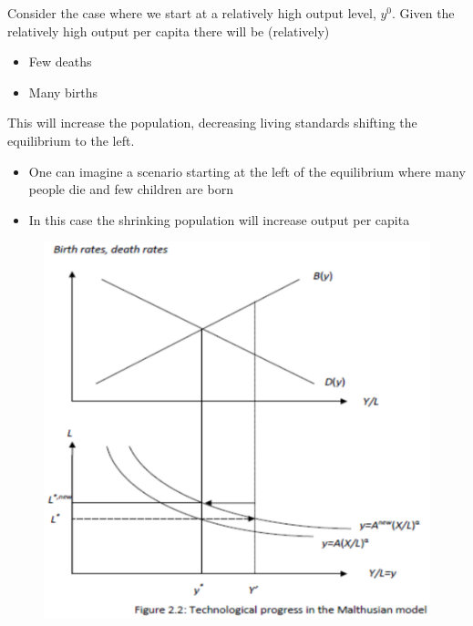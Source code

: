 \documentclass{beamer}
\begin{document}
\begin{frame}
  Consider the case where we start at a relatively high output level, $y^0$.
  Given the relatively high output per capita there will be (relatively)
  \begin{itemize}
    \item Few deaths
    \item Many births
  \end{itemize}
  \medskip
  This will increase the population, decreasing living standards shifting the equilibrium to the left. 
  \begin{itemize}
    \item One can imagine a scenario starting at the left of the equilibrium where many people die and few children are born
    \item In this case the shrinking population will increase output per capita
  \end{itemize}
\end{frame}

\begin{frame}
  \begin{figure}
    \includegraphics[scale=.7]{tech_progress.eps}
  \end{figure}
\end{frame}
\end{document}
